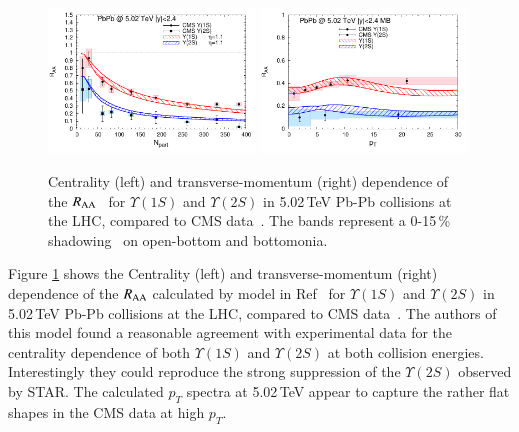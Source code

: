{{%

\begin{figure}[t]
\includegraphics[width=0.49\textwidth]{Figures/fig3_rapp.pdf}
\includegraphics[width=0.49\textwidth]{Figures/fig4_rapp.pdf}
\caption{Centrality (left) and transverse-momentum (right) dependence of the $R_{\rm AA}$~\cite{Rapp:2017chc}
  for $\Upsilon(1S)$ and $\Upsilon(2S)$ in 5.02\,TeV Pb-Pb collisions at the LHC,
  compared to CMS data~\cite{Flores:2017qmcms}.
  The bands represent a 0-15\,\% shadowing~\cite{Eskola:2009uj} on open-bottom and bottomonia.}
\label{fig_cms}
\end{figure}

Figure \ref{fig_cms} shows the Centrality (left) and transverse-momentum (right)
dependence of the $R_{\rm AA}$ calculated by model in Ref~\cite{Rapp:2017chc}
for $\Upsilon(1S)$ and $\Upsilon(2S)$ in 5.02\,TeV Pb-Pb collisions at the LHC,
compared to CMS data~\cite{Flores:2017qmcms}.
The authors of this model found a reasonable agreement  with experimental data
for the centrality dependence of both $\Upsilon(1S)$ and $\Upsilon(2S)$ at both
collision energies. Interestingly they could reproduce the strong suppression of
the $\Upsilon(2S)$ observed by STAR.  
The calculated $p_T$ spectra at 5.02\,TeV appear to capture the rather flat
shapes in the CMS data at high $p_T$. 



}}
